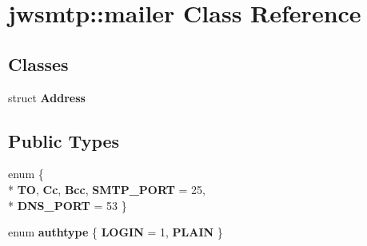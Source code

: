 \hypertarget{classjwsmtp_1_1mailer}{\section{jwsmtp\-:\-:mailer Class Reference}
\label{classjwsmtp_1_1mailer}
}
\subsection*{Classes}
\begin{DoxyCompactItemize}
\item 
struct {\bfseries Address}
\end{DoxyCompactItemize}
\subsection*{Public Types}
\begin{DoxyCompactItemize}
\item 
enum \{ \\*
{\bfseries T\-O}, 
{\bfseries Cc}, 
{\bfseries Bcc}, 
{\bfseries S\-M\-T\-P\-\_\-\-P\-O\-R\-T} =  25, 
\\*
{\bfseries D\-N\-S\-\_\-\-P\-O\-R\-T} =  53
 \}
\item 
enum {\bfseries authtype} \{ {\bfseries L\-O\-G\-I\-N} =  1, 
{\bfseries P\-L\-A\-I\-N}
 \}
\end{DoxyCompactItemize}

